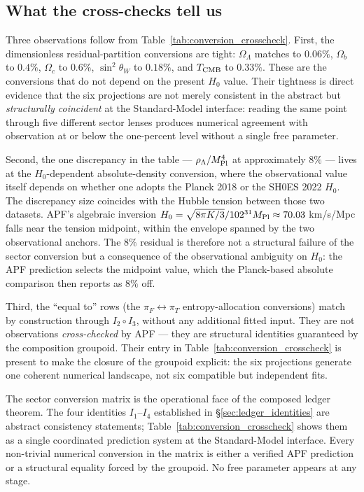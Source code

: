 \documentclass[11pt]{article}
\newcommand{\Mpl}{M_{\rm Pl}}
\begin{document}
\subsection{What the cross-checks tell us}\label{sec:conversion_interpretation}

Three observations follow from Table~\ref{tab:conversion_crosscheck}. First, the dimensionless residual-partition conversions are tight: $\Omega_\Lambda$ matches to $0.06\%$, $\Omega_b$ to $0.4\%$, $\Omega_c$ to $0.6\%$, $\sin^2\theta_W$ to $0.18\%$, and $T_{\rm CMB}$ to $0.33\%$. These are the conversions that do not depend on the present $H_0$ value. Their tightness is direct evidence that the six projections are not merely consistent in the abstract but \emph{structurally coincident} at the Standard-Model interface: reading the same point through five different sector lenses produces numerical agreement with observation at or below the one-percent level without a single free parameter.

Second, the one discrepancy in the table --- $\rho_\Lambda/\Mpl^4$ at approximately $8\%$ --- lives at the $H_0$-dependent absolute-density conversion, where the observational value itself depends on whether one adopts the Planck 2018 or the SH0ES 2022 $H_0$. The discrepancy size coincides with the Hubble tension between those two datasets. APF's algebraic inversion $H_0 = \sqrt{8\pi K/3}/102^{31} \Mpl \approx 70.03$ km/s/Mpc falls near the tension midpoint, within the envelope spanned by the two observational anchors. The $8\%$ residual is therefore not a structural failure of the sector conversion but a consequence of the observational ambiguity on $H_0$: the APF prediction selects the midpoint value, which the Planck-based absolute comparison then reports as $8\%$ off.

Third, the ``equal to'' rows (the $\pi_F \leftrightarrow \pi_T$ entropy-allocation conversions) match by construction through $I_2 \circ I_3$, without any additional fitted input. They are not observations \emph{cross-checked} by APF --- they are structural identities guaranteed by the composition groupoid. Their entry in Table~\ref{tab:conversion_crosscheck} is present to make the closure of the groupoid explicit: the six projections generate one coherent numerical landscape, not six compatible but independent fits.

The sector conversion matrix is the operational face of the composed ledger theorem. The four identities $I_1$--$I_4$ established in \S\ref{sec:ledger_identities} are abstract consistency statements; Table~\ref{tab:conversion_crosscheck} shows them as a single coordinated prediction system at the Standard-Model interface. Every non-trivial numerical conversion in the matrix is either a verified APF prediction or a structural equality forced by the groupoid. No free parameter appears at any stage.
\end{document}
